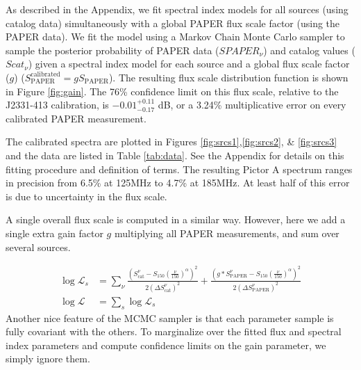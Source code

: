\documentclass[preprint]{aastex}
\newcommand{\PAPER}{\mathrm{PAPER}}
\begin{document}
As described in the Appendix, we fit spectral index models for all sources
(using catalog data) simultaneously with a global PAPER flux scale factor
(using the PAPER data). We fit the model using a Markov Chain Monte Carlo
sampler to sample the posterior probability of PAPER data ($SPAPER_{\nu}$) and
catalog values ($Scat_{\nu}$) given a spectral index model for each source and
a global flux scale factor ($g$) ($S_\PAPER^\textrm{calibrated} = g S_\PAPER$).
The resulting flux scale distribution function is shown in Figure
\ref{fig:gain}. The 76\% confidence limit on this flux scale, relative to the
J2331-413 calibration, is  $-0.01 ^{+0.11}_{-0.17}$ dB, or a 3.24\%
multiplicative error on every calibrated PAPER measurement.  


The calibrated spectra are plotted in Figures \ref{fig:srcs1},\ref{fig:srcs2},
\& \ref{fig:srcs3} and the data are listed in Table \ref{tab:data}.  See the
Appendix for details on this fitting procedure and definition of terms.  The
resulting Pictor A spectrum ranges in precision from 6.5\% at 125MHz to 4.7\%
at 185MHz. At least half of this error is due to uncertainty in the flux scale.  


A single overall flux scale is computed in a similar way. However, here we add
a single extra gain factor $g$ multiplying all PAPER measurements, and sum over
several sources.

\begin{align}
\log\mathcal{L}_s &= \sum_{\nu}\frac{ (S_\textrm{cat}^{\nu}  - S_{150}  \left(\frac{\nu}{150}\right)^\alpha)^2}{2(\Delta S_\textrm{cat}^\nu)^2} +
\frac{ (g*S_\PAPER^{\nu}  - S_{150}\left(\frac{\nu}{150}\right)^\alpha)^2}{2(\Delta S_\PAPER^\nu)^2}\\
\log\mathcal{L} &= \sum_{s} \log\mathcal{L}_s
\end{align}
Another nice feature of the MCMC sampler is that each parameter sample is fully
covariant with the others. To marginalize over the fitted flux and spectral
index parameters and compute confidence limits on the gain parameter, we simply
ignore them.
\end{document}
